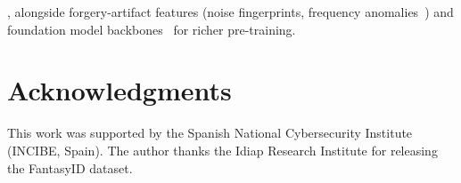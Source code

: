 , alongside forgery-artifact features
(noise fingerprints, frequency anomalies~\citep{cozzolino2020noiseprint}) and
foundation model backbones~\citep{fakeidet2025} for richer pre-training.

\section*{Acknowledgments}
This work was supported by the Spanish National Cybersecurity Institute (INCIBE,
Spain). The author thanks the Idiap Research Institute for releasing the
FantasyID dataset.
